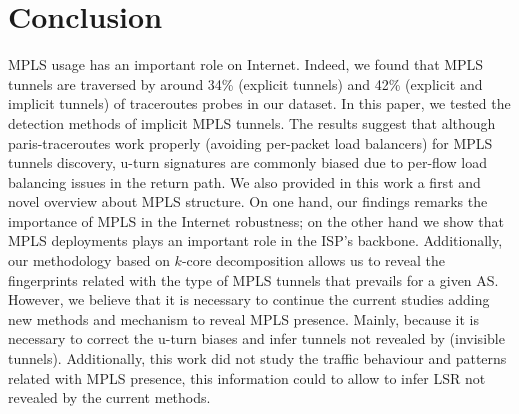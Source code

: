 \section{Conclusion}\label{ccl}

MPLS usage has an important role on Internet. Indeed, we found that MPLS
tunnels are traversed by around 34\% (explicit tunnels) and 42\% (explicit and implicit tunnels) of traceroutes probes in our dataset. In this paper, we tested the detection methods of implicit MPLS tunnels. The results suggest that although  paris-traceroutes work properly (avoiding per-packet load balancers) for MPLS tunnels discovery,  u-turn signatures are commonly biased due to per-flow load balancing issues in the return path. We also provided in this work a first and novel overview about MPLS structure. On one hand, our findings remarks the importance of MPLS in the Internet robustness; on the other hand we show that MPLS deployments plays an important role in the ISP's backbone.
Additionally, our methodology based on $k$-core decomposition allows us to reveal the fingerprints related with the type of MPLS tunnels that prevails for a given AS. However, we believe that it is necessary to continue the current studies adding new methods and mechanism to reveal MPLS presence. Mainly, because it is necessary to correct the u-turn biases and infer tunnels not revealed by \traceroute (invisible tunnels). Additionally, this work did not study the traffic behaviour and patterns related with MPLS presence, this information could to allow to infer LSR not revealed by the current methods.